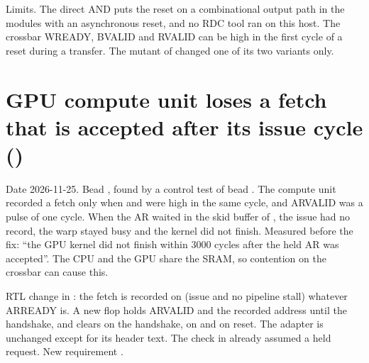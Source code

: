 \begin{record}

Limits. The direct AND puts the reset on a combinational output path in the modules with an asynchronous reset, and no RDC tool ran on this host. The crossbar WREADY, BVALID and RVALID can be high in the first cycle of a reset during a transfer. The mutant of  changed one of its two variants only.

\end{record}

\section{GPU compute unit loses a fetch that is accepted after its issue cycle ()}\label{cr:defect:gpu-fetch-lost}

\begin{record}

Date 2026-11-25. Bead , found by a control test of bead . The compute unit recorded a fetch only when  and  were high in the same cycle, and ARVALID was a pulse of one cycle. When the AR waited in the skid buffer of , the issue had no record, the warp stayed busy and the kernel did not finish. Measured before the fix: ``the GPU kernel did not finish within 3000 cycles after the held AR was accepted''. The CPU and the GPU share the SRAM, so contention on the crossbar can cause this.

\end{record}

\begin{record}

RTL change in : the fetch is recorded on  (issue and no pipeline stall) whatever ARREADY is. A new flop  holds ARVALID and the recorded address until the handshake, and clears on the handshake, on  and on reset. The adapter is unchanged except for its header text. The check  in  already assumed a held request. New requirement .

\end{record}

